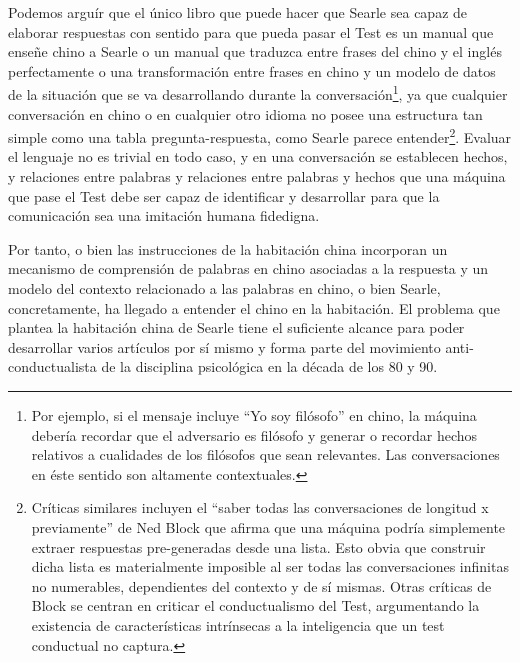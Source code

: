 \documentclass[12pt]{memoir}
\begin{document}
Podemos arguír que el único libro que puede hacer que Searle sea capaz de elaborar respuestas con sentido para que pueda pasar el Test es un manual que enseñe chino a Searle o un manual que traduzca entre frases del chino y el inglés perfectamente o una transformación entre frases en chino y un modelo de datos de la situación que se va desarrollando durante la conversación\footnote{Por ejemplo, si el mensaje incluye ``Yo soy filósofo'' en chino, la máquina debería recordar que el adversario es filósofo y generar o recordar hechos relativos a cualidades de los filósofos que sean relevantes. Las conversaciones en éste sentido son altamente contextuales.}, ya que cualquier conversación en chino o en cualquier otro idioma no posee una estructura tan simple como una tabla pregunta-respuesta, como Searle parece entender\footnote{Críticas similares incluyen el ``saber todas las conversaciones de longitud x previamente'' de Ned Block \parencite[apartado 4.1]{afterTuring} que afirma que una máquina podría simplemente extraer respuestas pre-generadas desde una lista. Esto obvia que construir dicha lista es materialmente imposible al ser todas las conversaciones infinitas no numerables, dependientes del contexto y de sí mismas. Otras críticas de Block se centran en criticar el conductualismo del Test, argumentando la existencia de características intrínsecas a la inteligencia que un test conductual no captura.}. Evaluar el lenguaje no es trivial en todo caso, y en una conversación se establecen hechos, y relaciones entre palabras y relaciones entre palabras y hechos que una máquina que pase el Test debe ser capaz de identificar y desarrollar para que la comunicación sea una imitación humana fidedigna. 

Por tanto, o bien las instrucciones de la habitación china incorporan un mecanismo de comprensión de palabras en chino asociadas a la respuesta y un modelo del contexto relacionado a las palabras en chino, o bien Searle, concretamente, ha llegado a entender el chino en la habitación. El problema que plantea la habitación china de Searle tiene el suficiente alcance para poder desarrollar varios artículos por sí mismo y forma parte del movimiento anti-conductualista de la disciplina psicológica en la década de los 80 y 90.
\end{document}
